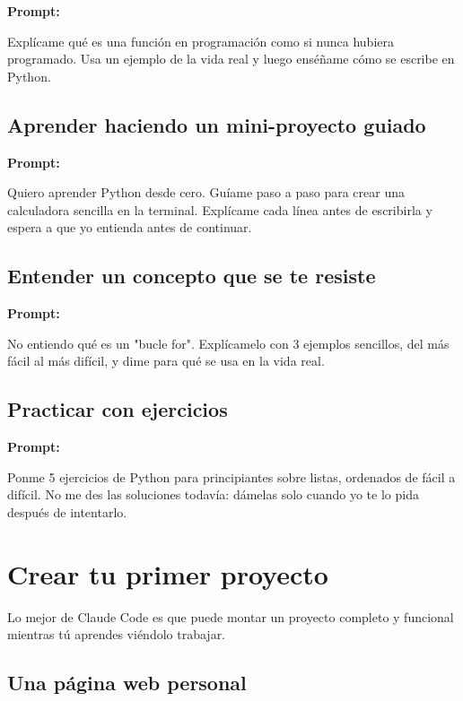 \documentclass[11pt,a4paper]{report}
\begin{document}
\noindent\textbf{Prompt: }
\begin{codebox}
Explícame qué es una función en programación como si nunca hubiera programado. Usa un ejemplo de la vida real y luego enséñame cómo se escribe en Python.
\end{codebox}

\subsection{Aprender haciendo un mini-proyecto guiado}

\noindent\textbf{Prompt: }
\begin{codebox}
Quiero aprender Python desde cero. Guíame paso a paso para crear una calculadora sencilla en la terminal. Explícame cada línea antes de escribirla y espera a que yo entienda antes de continuar.
\end{codebox}

\subsection{Entender un concepto que se te resiste}

\noindent\textbf{Prompt: }
\begin{codebox}
No entiendo qué es un "bucle for". Explícamelo con 3 ejemplos sencillos, del más fácil al más difícil, y dime para qué se usa en la vida real.
\end{codebox}

\subsection{Practicar con ejercicios}

\noindent\textbf{Prompt: }
\begin{codebox}
Ponme 5 ejercicios de Python para principiantes sobre listas, ordenados de fácil a difícil. No me des las soluciones todavía: dámelas solo cuando yo te lo pida después de intentarlo.
\end{codebox}

\section{ Crear tu primer proyecto}

Lo mejor de Claude Code es que puede montar un proyecto completo y funcional mientras tú aprendes viéndolo trabajar.

\subsection{Una página web personal}
\end{document}
